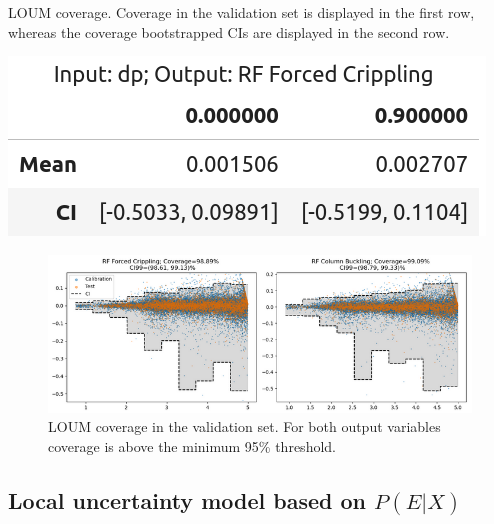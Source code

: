 \begin{table}[!htb]
	\centering
	\caption{LOUM coverage. Coverage in the validation set is displayed in the first row, whereas the coverage bootstrapped CIs are displayed in the second row.}
	\includegraphics[scale=\tabscale]{Figures/uncertainty/loumtab2.png}
	\label{tab:loumtab2}
\end{table}
\begin{figure}
	\centering
	\includegraphics[width=\textwidth]{Figures/uncertainty/loumcoverage.png}
	\caption{LOUM coverage in the validation set. For both output variables coverage is above the minimum 95\% threshold.}
	\label{fig:loum1}
\end{figure}

\subsection{Local uncertainty model based on $P(E|X)$}
